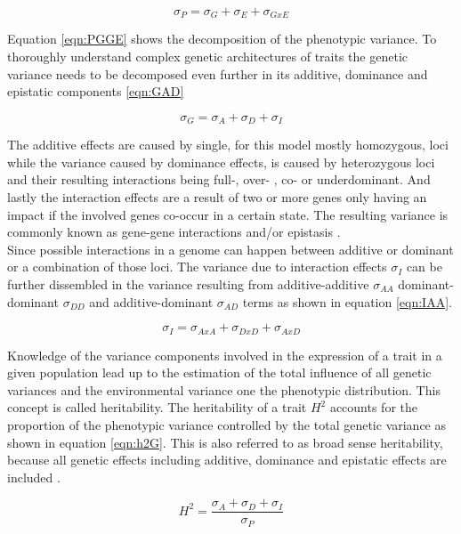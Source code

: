 \begin{equation}
 \sigma_{P} = \sigma_{G} + \sigma_{E} + \sigma_{GxE}
 \label{eqn:PGGE}
\end{equation}


Equation \ref{eqn:PGGE} shows the decomposition of the phenotypic variance. To thoroughly understand complex
genetic architectures of traits the genetic variance needs to be decomposed even further in its additive, dominance
and epistatic components \ref{eqn:GAD}

\begin{equation}
 \sigma_{G} = \sigma_{A} + \sigma_{D} + \sigma_{I}
 \label{eqn:GAD}
\end{equation}


The additive effects are caused by single, for this model mostly homozygous, loci while the variance caused by
dominance effects, is caused by heterozygous loci and their resulting interactions being full-, over- , co- or
underdominant. And lastly the interaction effects are a result of two or more genes only having an impact
if the involved genes co-occur in a certain state. The resulting variance is commonly known
as gene-gene interactions and/or epistasis \cite{falconer1996}. \\
Since possible interactions in a genome can happen between additive or dominant or a combination of those
loci. The variance due to interaction effects $\sigma_{I}$ can be further dissembled in the variance resulting
from additive-additive $\sigma_{AA}$ dominant-dominant $\sigma_{DD}$ and additive-dominant $\sigma_{AD}$ terms
as shown in equation \ref{eqn:IAA}.

\begin{equation}
 \sigma_{I} = \sigma_{AxA} + \sigma_{DxD} + \sigma_{AxD}
 \label{eqn:IAA}
\end{equation}


Knowledge of the variance components involved in the expression of a trait in a given population lead up to the
estimation of the total influence of all genetic variances and the environmental variance one the phenotypic
distribution. This concept is called heritability. The heritability of a trait $H^2$ accounts for the
proportion of the phenotypic variance controlled by the total genetic variance as shown in equation
\ref{eqn:h2G}. This is also referred to as broad sense heritability, because all genetic effects including
additive, dominance and epistatic effects are included \cite{brooker1999genetics}.


\begin{equation}
 H^2 = \frac{\sigma_{A} + \sigma_{D} + \sigma_{I}}{\sigma_{P}}
 \label{eqn:h2G}
\end{equation}


